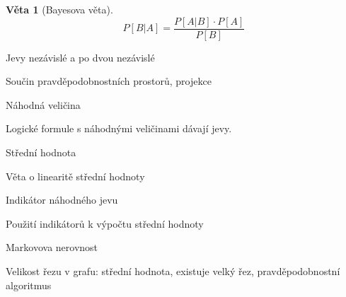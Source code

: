 \documentclass[10pt,a4paper]{article}
\theoremstyle{plain}
\newtheorem{veta}{Věta}
\theoremstyle{definition}
\begin{document}
\begin{veta}[Bayesova věta]
\[P[B|A] = \frac{P[A|B] \cdot P[A]}{P[B]}\]
\end{veta}



Jevy nezávislé a po dvou nezávislé

Součin pravděpodobnostních prostorů, projekce

Náhodná veličina

Logické formule s náhodnými veličinami dávají jevy.

Střední hodnota

Věta o linearitě střední hodnoty

Indikátor náhodného jevu

Použití indikátorů k výpočtu střední hodnoty

Markovova nerovnost

Velikost řezu v grafu: střední hodnota, existuje velký řez, pravděpodobnostní algoritmus 
\end{document}
